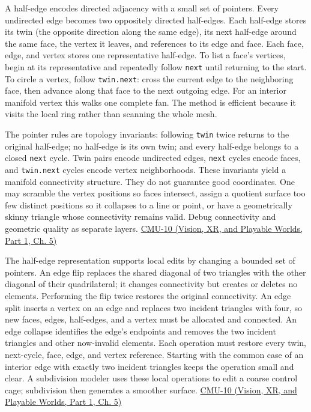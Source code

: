 A half-edge encodes directed adjacency with a small set of pointers. Every undirected edge becomes two oppositely directed half-edges. Each half-edge stores its twin (the opposite direction along the same edge), its next half-edge around the same face, the vertex it leaves, and references to its edge and face. Each face, edge, and vertex stores one representative half-edge. To list a face's vertices, begin at its representative and repeatedly follow \texttt{next} until returning to the start. To circle a vertex, follow \texttt{twin.next}: cross the current edge to the neighboring face, then advance along that face to the next outgoing edge. For an interior manifold vertex this walks one complete fan. The method is efficient because it visits the local ring rather than scanning the whole mesh.

The pointer rules are topology invariants: following \texttt{twin} twice returns to the original half-edge; no half-edge is its own twin; and every half-edge belongs to a closed \texttt{next} cycle. Twin pairs encode undirected edges, \texttt{next} cycles encode faces, and \texttt{twin.next} cycles encode vertex neighborhoods. These invariants yield a manifold connectivity structure. They do not guarantee good coordinates. One may scramble the vertex positions so faces intersect, assign a quotient surface too few distinct positions so it collapses to a line or point, or have a geometrically skinny triangle whose connectivity remains valid. Debug connectivity and geometric quality as separate layers. \href{../07-Vision-XR-and-Playable-Worlds-P01/main.pdf\#nameddest=04-visual-computing-ii-ch036-cmu-10---meshes-and-manifolds}{CMU-10 (Vision, XR, and Playable Worlds, Part 1, Ch. 5)}

The half-edge representation supports local edits by changing a bounded set of pointers. An edge flip replaces the shared diagonal of two triangles with the other diagonal of their quadrilateral; it changes connectivity but creates or deletes no elements. Performing the flip twice restores the original connectivity. An edge split inserts a vertex on an edge and replaces two incident triangles with four, so new faces, edges, half-edges, and a vertex must be allocated and connected. An edge collapse identifies the edge's endpoints and removes the two incident triangles and other now-invalid elements. Each operation must restore every twin, next-cycle, face, edge, and vertex reference. Starting with the common case of an interior edge with exactly two incident triangles keeps the operation small and clear. A subdivision modeler uses these local operations to edit a coarse control cage; subdivision then generates a smoother surface. \href{../07-Vision-XR-and-Playable-Worlds-P01/main.pdf\#nameddest=04-visual-computing-ii-ch036-cmu-10---meshes-and-manifolds}{CMU-10 (Vision, XR, and Playable Worlds, Part 1, Ch. 5)}

